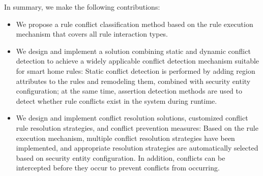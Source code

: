 In summary, we make the following contributions:

\begin{itemize}
	\item We propose a rule conflict classification method based on the rule execution mechanism that covers all rule interaction types.
	
	\item We design and implement a solution combining static and dynamic conflict detection to achieve a widely applicable conflict detection mechanism suitable for smart home rules: Static conflict detection is performed by adding region attributes to the rules and remodeling them, combined with security entity configuration; at the same time, assertion detection methods are used to detect whether rule conflicts exist in the system during runtime.
	
	\item We design and implement conflict resolution solutions, customized conflict rule resolution strategies, and conflict prevention measures: Based on the rule execution mechanism, multiple conflict resolution strategies have been implemented, and appropriate resolution strategies are automatically selected based on security entity configuration. In addition, conflicts can be intercepted before they occur to prevent conflicts from occurring.
\end{itemize}
